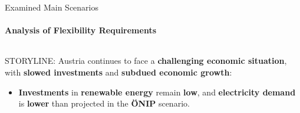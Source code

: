 \documentclass[aspectratio=169]{beamer}
\begin{document}
\begin{frame}{Examined Main Scenarios}
    \framesubtitle{Analysis of Flexibility Requirements}

    \vspace{-1.5cm}
    \begin{columns}
        \begin{column}{0.32\textwidth}
            \begin{coloredblock}
                \begin{minipage}[t][3.5cm]{0.9\textwidth} 
                    \scriptsize STORYLINE: Austria continues to face a \textbf{challenging economic situation}, with \textbf{slowed investments} and \textbf{subdued economic growth}:
                \end{minipage}
                \begin{minipage}[t][2cm]{0.9\textwidth}
                    \begin{itemize}
                        \item \scriptsize \textbf{Investments} in \textbf{renewable energy} remain \textbf{low}, and \textbf{electricity demand} is \textbf{lower} than projected in the \textbf{ÖNIP} scenario.


\end{itemize}
\end{minipage}
\end{coloredblock}
\end{column}
\end{columns}
\end{frame}
\end{document}
